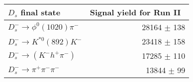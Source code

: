  \begin{tabular}{l r }
\hline\hline
$D_s$ final state  & Signal yield for Run II\ \\
\hline
$D_{s}^{-} \to \phi^{0}(1020)\pi^{-}$ & 28164 $\pm$ 138 \\
$D_{s}^{-}\to K^{*0}(892)K^{-}$ & 23418 $\pm$ 158 \\
$D_{s}^{-}\to (K^{-}h^{+}\pi^{-})$ & 17285 $\pm$ 110 \\
$D_{s}^{-}\to \pi^{+}\pi^{-}\pi^{-}$ & 13844 $\pm$ 99 \\
\hline\hline
\end{tabular}
\label{table:normYieldsDs_run2}
